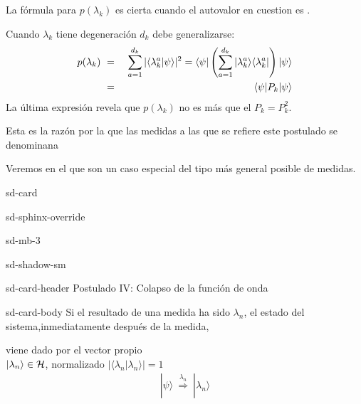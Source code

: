 \documentclass[letterpaper,10pt,english]{jupyterBook}
\newcommand{\bra}[1]{\langle #1|}
\newcommand{\ket}[1]{|#1\rangle}
\newcommand{\braket}[2]{\langle #1|#2\rangle}
\newcommand{\ketbra}[2]{| #1\rangle \langle #2 |}
\newcommand{\Hil}{{\cal H}}
\begin{document}
\sphinxAtStartPar
La fórmula para \(p(\lambda_k)\)  es cierta cuando el autovalor en cuestion es .

\sphinxAtStartPar
Cuando \(\lambda_k\) tiene degeneración \(d_k\) debe generalizarse:
\label{equation:docs/Part_01_Formalismo/Chapter_02_01_Fundamentos_MC_myst:dd454b5c-f43e-461c-bb13-9a7217a88754}\begin{eqnarray}
p(\lambda_k)~ &=& ~ \sum_{a=1}^{d_k}|\braket{\lambda^a_k}{\psi}|^2 = \bra{\psi}\left(
 \sum_{a=1}^{d_k}\ketbra{\lambda^a_k}{\lambda^a_k}\right) \ket{\psi}\nonumber\\
&=&  \bra{\psi}P_k\ket{\psi} \rule{0mm}{7mm}\\
\end{eqnarray}
\sphinxAtStartPar
La última expresión revela que \(p(\lambda_k)\) no es más que el  \(P_k = P^2_k\).

\sphinxAtStartPar
Esta es la razón por la que las medidas a las que se refiere este postulado se denominana 

\sphinxAtStartPar
Veremos en el  que son un caso especial del tipo más general posible de medidas.

\begin{sphinxuseclass}{sd-card}
\begin{sphinxuseclass}{sd-sphinx-override}
\begin{sphinxuseclass}{sd-mb-3}
\begin{sphinxuseclass}{sd-shadow-sm}
\begin{sphinxuseclass}{sd-card-header}
\sphinxAtStartPar
Postulado IV: Colapso de la función de  onda

\end{sphinxuseclass}
\begin{sphinxuseclass}{sd-card-body}
\sphinxAtStartPar
Si el resultado de una medida  ha sido  \(\lambda_n\),
el estado del sistema,inmediatamente después de la medida,

\sphinxAtStartPar
viene dado por el vector propio\\
\(\ket{\lambda_n} \in \Hil\), normalizado \(|\braket{\lambda_n}{\lambda_n}|=1\)
\begin{equation*}
\begin{split}
\ket{\psi}~\stackrel{\lambda_n}{\Longrightarrow}~ \ket{\lambda_n} 
\end{split}
\end{equation*}
\end{sphinxuseclass}
\end{sphinxuseclass}
\end{sphinxuseclass}
\end{sphinxuseclass}
\end{sphinxuseclass}
\end{document}
